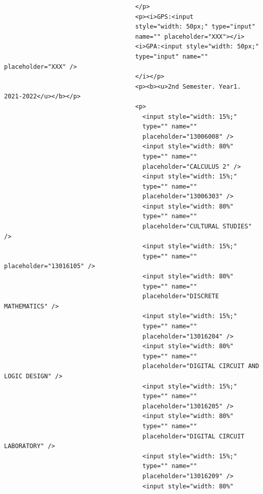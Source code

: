 \documentclass[12pt]{report} %
\begin{document}
\begin{verbatim}
                                    </p>
                                    <p><i>GPS:<input 
                                    style="width: 50px;" type="input"
                                    name="" placeholder="XXX"></i> 
                                    <i>GPA:<input style="width: 50px;"
                                    type="input" name="" placeholder="XXX" />
                                    </i></p>
                                    <p><b><u>2nd Semester. Year1. 2021-2022</u></b></p>
                                    <p>
                                      <input style="width: 15%;"
                                      type="" name=""
                                      placeholder="13006008" />
                                      <input style="width: 80%"
                                      type="" name=""
                                      placeholder="CALCULUS 2" />
                                      <input style="width: 15%;"
                                      type="" name=""
                                      placeholder="13006303" />
                                      <input style="width: 80%"
                                      type="" name=""
                                      placeholder="CULTURAL STUDIES" />
                                      <input style="width: 15%;"
                                      type="" name="" placeholder="13016105" />
                                      <input style="width: 80%"
                                      type="" name=""
                                      placeholder="DISCRETE MATHEMATICS" />
                                      <input style="width: 15%;"
                                      type="" name=""
                                      placeholder="13016204" />
                                      <input style="width: 80%"
                                      type="" name=""
                                      placeholder="DIGITAL CIRCUIT AND LOGIC DESIGN" />
                                      <input style="width: 15%;"
                                      type="" name=""
                                      placeholder="13016205" />
                                      <input style="width: 80%"
                                      type="" name=""
                                      placeholder="DIGITAL CIRCUIT LABORATORY" />
                                      <input style="width: 15%;"
                                      type="" name=""
                                      placeholder="13016209" />
                                      <input style="width: 80%"

\end{verbatim}
\end{document}
